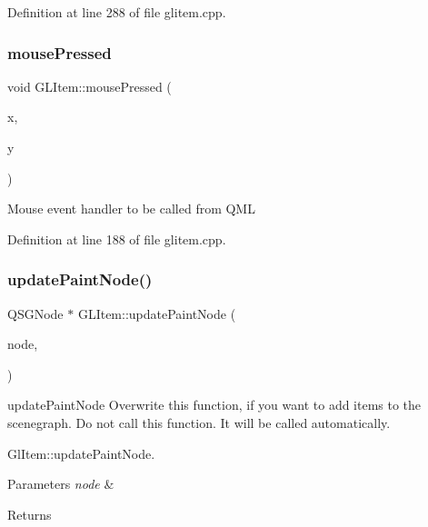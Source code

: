 Definition at line 288 of file glitem.\+cpp.

\mbox{\label{class_g_l_item_aba4710ee3d504c893e493a2a9f48efd0}} 
\subsubsection{\texorpdfstring{mousePressed}{mousePressed}}
{\footnotesize\ttfamily void G\+L\+Item\+::mouse\+Pressed (\begin{DoxyParamCaption}\item[{int}]{x,  }\item[{int}]{y }\end{DoxyParamCaption})\hspace{0.3cm}{\ttfamily [slot]}}

Mouse event handler to be called from Q\+ML 

Definition at line 188 of file glitem.\+cpp.

\mbox{\label{class_g_l_item_a3ee5b8ed5321e4b60d233328e3b89d3a}} 
\subsubsection{\texorpdfstring{updatePaintNode()}{updatePaintNode()}}
{\footnotesize\ttfamily Q\+S\+G\+Node $\ast$ G\+L\+Item\+::update\+Paint\+Node (\begin{DoxyParamCaption}\item[{Q\+S\+G\+Node $\ast$}]{node,  }\item[{Update\+Paint\+Node\+Data $\ast$}]{ }\end{DoxyParamCaption})}



update\+Paint\+Node Overwrite this function, if you want to add items to the scenegraph. Do not call this function. It will be called automatically. 

Gl\+Item\+::update\+Paint\+Node.


\begin{DoxyParams}{Parameters}
{\em node} & \\
\hline
\end{DoxyParams}
\begin{DoxyReturn}{Returns}

\end{DoxyReturn}

